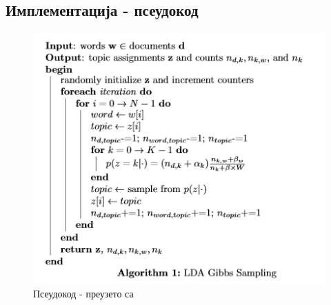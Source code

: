 \subsection{Имплементација - псеудокод}
%
\begin{figure}[H]
  \includegraphics[scale=0.8]{./Slike/slika30.png} 
  \caption{Псеудокод - преузето са \cite{verov10} }\label{fig:slika27}
\end{figure}
%
%
%

